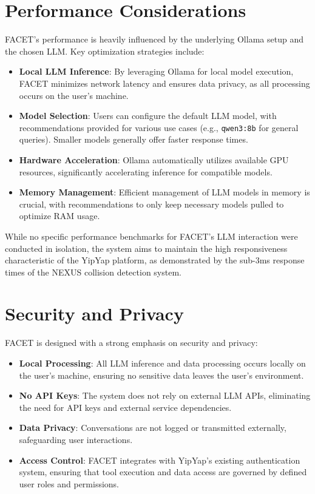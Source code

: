 \documentclass[10pt]{article}
\begin{document}
\section{Performance Considerations}
FACET's performance is heavily influenced by the underlying Ollama setup and the chosen LLM. Key optimization strategies include:
\begin{itemize}
    \item \textbf{Local LLM Inference}: By leveraging Ollama for local model execution, FACET minimizes network latency and ensures data privacy, as all processing occurs on the user's machine.
    \item \textbf{Model Selection}: Users can configure the default LLM model, with recommendations provided for various use cases (e.g., \texttt{qwen3:8b} for general queries). Smaller models generally offer faster response times.
    \item \textbf{Hardware Acceleration}: Ollama automatically utilizes available GPU resources, significantly accelerating inference for compatible models.
    \item \textbf{Memory Management}: Efficient management of LLM models in memory is crucial, with recommendations to only keep necessary models pulled to optimize RAM usage.
\end{itemize}
While no specific performance benchmarks for FACET's LLM interaction were conducted in isolation, the system aims to maintain the high responsiveness characteristic of the YipYap platform, as demonstrated by the sub-3ms response times of the NEXUS collision detection system.

\section{Security and Privacy}
FACET is designed with a strong emphasis on security and privacy:
\begin{itemize}
    \item \textbf{Local Processing}: All LLM inference and data processing occurs locally on the user's machine, ensuring no sensitive data leaves the user's environment.
    \item \textbf{No API Keys}: The system does not rely on external LLM APIs, eliminating the need for API keys and external service dependencies.
    \item \textbf{Data Privacy}: Conversations are not logged or transmitted externally, safeguarding user interactions.
    \item \textbf{Access Control}: FACET integrates with YipYap's existing authentication system, ensuring that tool execution and data access are governed by defined user roles and permissions.
\end{itemize}
\end{document}
